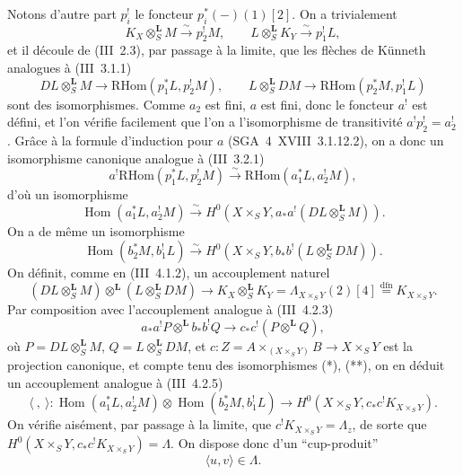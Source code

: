 \documentclass[11pt]{article}
\DeclareMathOperator{\Hom}{Hom}
\providecommand{\RHom}{\mathrm{RHom}}
\providecommand{\LL}{\mathbf L}
\begin{document}
Notons d'autre part $p_i^!$ le foncteur $p_i^*(-)(1)[2]$. On a trivialement
\[
K_X\otimes_S^{\LL}M\xrightarrow{\sim}p_2^!M,
\qquad
L\otimes_S^{\LL}K_Y\xrightarrow{\sim}p_1^!L,
\]
et il découle de (III~2.3), par passage à la limite, que les flèches de Künneth analogues à (III~3.1.1)
\[
DL\otimes_S^{\LL}M\longrightarrow \RHom(p_1^*L,p_2^!M),
\qquad
L\otimes_S^{\LL}DM\longrightarrow \RHom(p_2^*M,p_1^!L)
\]
sont des isomorphismes. Comme $a_2$ est fini, $a$ est fini, donc le foncteur $a^!$ est défini, et l'on vérifie facilement que l'on a l'isomorphisme de transitivité $a^!p_2^!=a_2^!$. Grâce à la formule d'induction pour $a$ (SGA~4~XVIII~3.1.12.2), on a donc un isomorphisme canonique analogue à (III~3.2.1)
\[
a^!\RHom(p_1^*L,p_2^!M)\xrightarrow{\sim}\RHom(a_1^*L,a_2^!M),
\]
d'où un isomorphisme
\begin{equation}\tag{*}
\Hom(a_1^*L,a_2^!M)\xrightarrow{\sim}H^0(X\times_S Y,a_*a^!(DL\otimes_S^{\LL}M)).
\end{equation}
On a de même un isomorphisme
\begin{equation}\tag{**}
\Hom(b_2^*M,b_1^!L)\xrightarrow{\sim}H^0(X\times_S Y,b_*b^!(L\otimes_S^{\LL}DM)).
\end{equation}
On définit, comme en (III~4.1.2), un accouplement naturel
\[
(DL\otimes_S^{\LL}M)\otimes^{\LL}(L\otimes_S^{\LL}DM)
\longrightarrow K_X\otimes_S^{\LL}K_Y=\Lambda_{X\times_S Y}(2)[4]\stackrel{\mathrm{dfn}}{=}K_{X\times_S Y}.
\]
Par composition avec l'accouplement analogue à (III~4.2.3)
\[
a_*a^!P\otimes^{\LL} b_*b^!Q\longrightarrow c_*c^!(P\otimes^{\LL}Q),
\]
où $P=DL\otimes_S^{\LL}M$, $Q=L\otimes_S^{\LL}DM$, et $c:Z=A\times_{(X\times_S Y)}B\to X\times_S Y$ est la projection canonique, et compte tenu des isomorphismes (*), (**), on en déduit un accouplement analogue à (III~4.2.5)
\[
\langle\ ,\ \rangle:\Hom(a_1^*L,a_2^!M)\otimes\Hom(b_2^*M,b_1^!L)
\longrightarrow H^0(X\times_S Y,c_*c^!K_{X\times_S Y}).
\]
On vérifie aisément, par passage à la limite, que $c^!K_{X\times_S Y}=\Lambda_z$, de sorte que $H^0(X\times_S Y,c_*c^!K_{X\times_S Y})=\Lambda$. On dispose donc d'un ``cup-produit''
\begin{equation}\tag{1.1.2}
\langle u,v\rangle\in\Lambda.
\end{equation}
\end{document}
